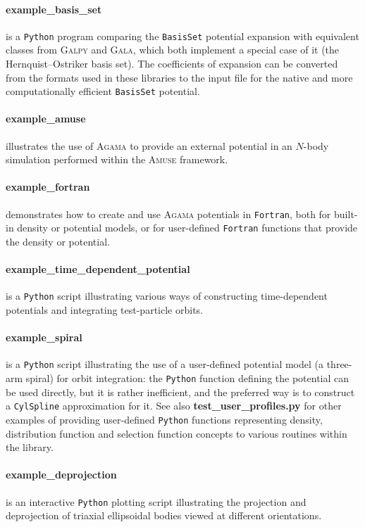 \documentclass[12pt]{article}
\newcommand{\Agama}{\textsc{Agama}\xspace}
\newcommand{\Amuse}{\textsc{Amuse}\xspace}
\newcommand{\Galpy}{\textsc{Galpy}\xspace}
\newcommand{\Gala} {\textsc{Gala}\xspace}
\newcommand{\Python}{\texttt{Python}\xspace}
\newcommand{\Fortran}{\texttt{Fortran}\xspace}
\newcommand{\ppp}[1]{\textcolor{darkolive} {\texttt{#1}}}
\begin{document}
\paragraph{example_basis_set} is a \Python program comparing the \ppp{BasisSet} potential expansion with equivalent classes from \Galpy and \Gala, which both implement a special case of it (the Hernquist--Ostriker basis set). The coefficients of expansion can be converted from the formats used in these libraries to the input file for the native and more computationally efficient \ppp{BasisSet} potential.

\paragraph{example_amuse} illustrates the use of \Agama to provide an external potential in an $N$-body simulation performed within the \Amuse framework.

\paragraph{example_fortran} demonstrates how to create and use \Agama potentials in \Fortran, both for built-in density or potential models, or for user-defined \Fortran functions that provide the density or potential.

\paragraph{example_time_dependent_potential} is a \Python script illustrating various ways of constructing time-dependent potentials and integrating test-particle orbits.

\paragraph{example_spiral} \label{sec:ExampleSpiral} is a \Python script illustrating the use of a user-defined potential model (a three-arm spiral) for orbit integration: the \Python function defining the potential can be used directly, but it is rather inefficient, and the preferred way is to construct a \ppp{CylSpline} approximation for it. See also \textbf{test\_user\_profiles.py} for other examples of providing user-defined \Python functions representing density, distribution function and selection function concepts to various routines within the library.

\paragraph{example_deprojection} is an interactive \Python plotting script illustrating the projection and deprojection of triaxial ellipsoidal bodies viewed at different orientations.
\end{document}
